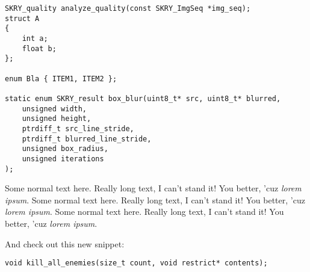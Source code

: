 \documentclass[12pt]{report}
\begin{document}

\begin{lstlisting}
SKRY_quality analyze_quality(const SKRY_ImgSeq *img_seq);
struct A
{
    int a;
    float b;
};

enum Bla { ITEM1, ITEM2 };

static enum SKRY_result box_blur(uint8_t* src, uint8_t* blurred,
    unsigned width,
    unsigned height,
    ptrdiff_t src_line_stride,
    ptrdiff_t blurred_line_stride,
    unsigned box_radius,
    unsigned iterations
);

\end{lstlisting}

Some normal text here. Really long text, I can't stand it! You better, 'cuz \emph{lorem ipsum}. Some normal text here.
Really long text, I can't stand it! You better, 'cuz \emph{lorem ipsum}. Some normal text here. Really long text,
I can't stand it! You better, 'cuz \emph{lorem ipsum}.

And check out this new snippet:

\begin{lstlisting}
void kill_all_enemies(size_t count, void restrict* contents);
\end{lstlisting}
\end{document}
